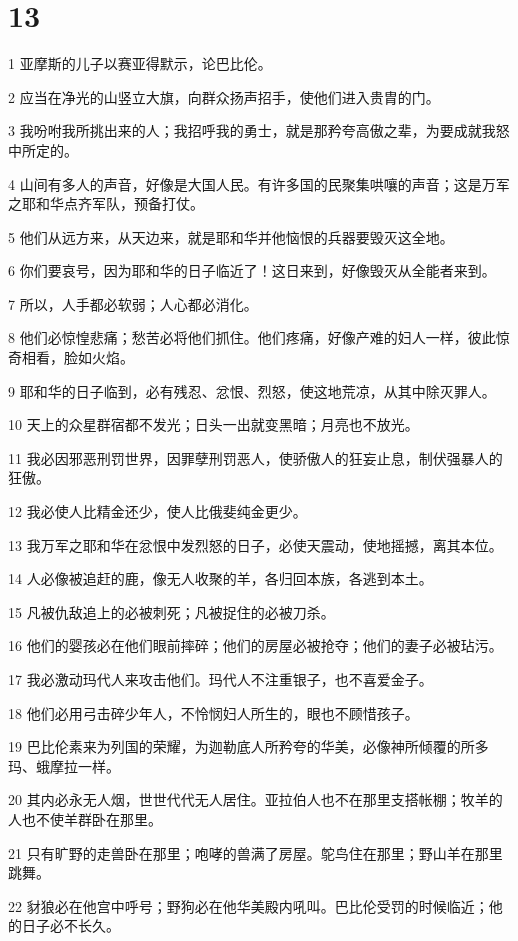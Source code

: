 \chapter{13}

\par 1 亚摩斯的儿子以赛亚得默示，论巴比伦。
\par 2 应当在净光的山竖立大旗，向群众扬声招手，使他们进入贵胄的门。
\par 3 我吩咐我所挑出来的人；我招呼我的勇士，就是那矜夸高傲之辈，为要成就我怒中所定的。
\par 4 山间有多人的声音，好像是大国人民。有许多国的民聚集哄嚷的声音；这是万军之耶和华点齐军队，预备打仗。
\par 5 他们从远方来，从天边来，就是耶和华并他恼恨的兵器要毁灭这全地。
\par 6 你们要哀号，因为耶和华的日子临近了！这日来到，好像毁灭从全能者来到。
\par 7 所以，人手都必软弱；人心都必消化。
\par 8 他们必惊惶悲痛；愁苦必将他们抓住。他们疼痛，好像产难的妇人一样，彼此惊奇相看，脸如火焰。
\par 9 耶和华的日子临到，必有残忍、忿恨、烈怒，使这地荒凉，从其中除灭罪人。
\par 10 天上的众星群宿都不发光；日头一出就变黑暗；月亮也不放光。
\par 11 我必因邪恶刑罚世界，因罪孽刑罚恶人，使骄傲人的狂妄止息，制伏强暴人的狂傲。
\par 12 我必使人比精金还少，使人比俄斐纯金更少。
\par 13 我万军之耶和华在忿恨中发烈怒的日子，必使天震动，使地摇撼，离其本位。
\par 14 人必像被追赶的鹿，像无人收聚的羊，各归回本族，各逃到本土。
\par 15 凡被仇敌追上的必被刺死；凡被捉住的必被刀杀。
\par 16 他们的婴孩必在他们眼前摔碎；他们的房屋必被抢夺；他们的妻子必被玷污。
\par 17 我必激动玛代人来攻击他们。玛代人不注重银子，也不喜爱金子。
\par 18 他们必用弓击碎少年人，不怜悯妇人所生的，眼也不顾惜孩子。
\par 19 巴比伦素来为列国的荣耀，为迦勒底人所矜夸的华美，必像神所倾覆的所多玛、蛾摩拉一样。
\par 20 其内必永无人烟，世世代代无人居住。亚拉伯人也不在那里支搭帐棚；牧羊的人也不使羊群卧在那里。
\par 21 只有旷野的走兽卧在那里；咆哮的兽满了房屋。鸵鸟住在那里；野山羊在那里跳舞。
\par 22 豺狼必在他宫中呼号；野狗必在他华美殿内吼叫。巴比伦受罚的时候临近；他的日子必不长久。

